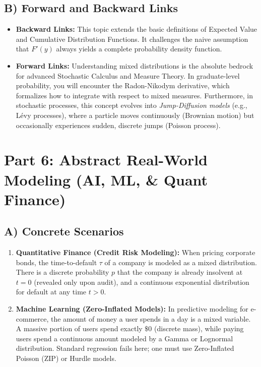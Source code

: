 \documentclass[11pt, a4paper]{article}
\theoremstyle{definition}
\theoremstyle{remark}
\begin{document}
\subsection{B) Forward and Backward Links}
\begin{itemize}
    \item \textbf{Backward Links:} This topic extends the basic definitions of Expected Value and Cumulative Distribution Functions. It challenges the naive assumption that $F'(y)$ always yields a complete probability density function.
    \item \textbf{Forward Links:} Understanding mixed distributions is the absolute bedrock for advanced Stochastic Calculus and Measure Theory. In graduate-level probability, you will encounter the Radon-Nikodym derivative, which formalizes how to integrate with respect to mixed measures. Furthermore, in stochastic processes, this concept evolves into \textit{Jump-Diffusion models} (e.g., Lévy processes), where a particle moves continuously (Brownian motion) but occasionally experiences sudden, discrete jumps (Poisson process).
\end{itemize}

\section{Part 6: Abstract Real-World Modeling (AI, ML, \& Quant Finance)}

\subsection{A) Concrete Scenarios}
\begin{enumerate}
    \item \textbf{Quantitative Finance (Credit Risk Modeling):} When pricing corporate bonds, the time-to-default $\tau$ of a company is modeled as a mixed distribution. There is a discrete probability $p$ that the company is already insolvent at $t=0$ (revealed only upon audit), and a continuous exponential distribution for default at any time $t > 0$.
    \item \textbf{Machine Learning (Zero-Inflated Models):} In predictive modeling for e-commerce, the amount of money a user spends in a day is a mixed variable. A massive portion of users spend exactly $\$0$ (discrete mass), while paying users spend a continuous amount modeled by a Gamma or Lognormal distribution. Standard regression fails here; one must use Zero-Inflated Poisson (ZIP) or Hurdle models.
\end{enumerate}
\end{document}

